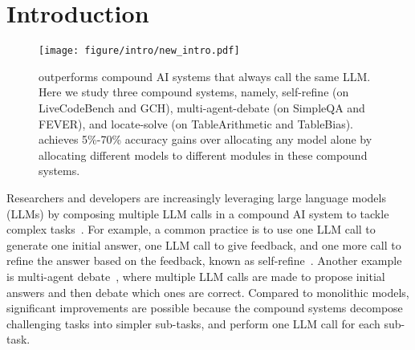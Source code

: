 \section{Introduction}
\begin{figure*}[!ht]
    \centering
    \texttt{[image: figure/intro/new\_intro.pdf]}
    \caption{\deluxesystem{} outperforms compound AI systems that always call the same LLM. Here we study three compound systems, namely, self-refine (on LiveCodeBench and GCH), multi-agent-debate (on SimpleQA and FEVER), and locate-solve (on TableArithmetic and TableBias).  \deluxesystem{} achieves 5\%-70\% accuracy gains over allocating any model alone by allocating different models to different modules in these compound systems.
    }
    \label{fig:deluxeagent:intro}
\end{figure*}
Researchers and developers are increasingly leveraging large language models (LLMs) by composing multiple LLM calls in a compound AI system to tackle complex tasks~\cite{multi_agent_debate_2024,zhang2024chain,madaan2024self,deepmind2025alphacode2,shinn2024reflexion,renze2024self,compound-ai-blog}. For example, a common practice is to use one LLM call to generate one initial answer, one LLM call to give feedback, and one more call to refine the answer based on the feedback, known as self-refine~\cite{renze2024self,madaan2024self,ji2023towards}.
Another example is multi-agent debate~\cite{multi_agent_debate_2024,liang-etal-2024-encouraging,khan2024debating}, where multiple LLM calls are made to propose initial answers and then debate which ones are correct.  Compared to monolithic models, significant improvements are possible because the compound systems decompose challenging tasks into simpler sub-tasks, and perform one LLM call for each sub-task.

